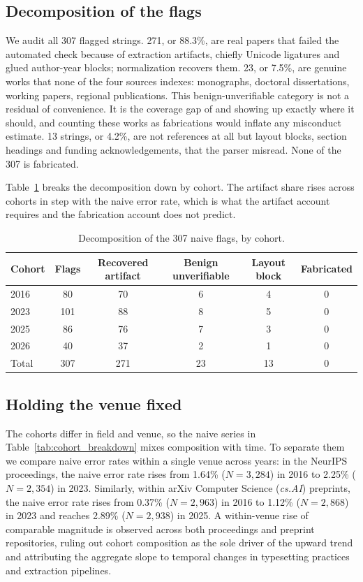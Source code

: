 \documentclass[11pt, a4paper]{article}
\begin{document}
\subsection{Decomposition of the flags}
We audit all 307 flagged strings. 271, or 88.3\%, are real papers that failed the automated check because of extraction artifacts, chiefly Unicode ligatures and glued author-year blocks; normalization recovers them. 23, or 7.5\%, are genuine works that none of the four sources indexes: monographs, doctoral dissertations, working papers, regional publications. This benign-unverifiable category is not a residual of convenience. It is the coverage gap of \citet{martinmartin2018} and \citet{visser2021} showing up exactly where it should, and counting these works as fabrications would inflate any misconduct estimate. 13 strings, or 4.2\%, are not references at all but layout blocks, section headings and funding acknowledgements, that the parser misread. None of the 307 is fabricated.

Table~\ref{tab:cohort_decomposition} breaks the decomposition down by cohort. The artifact share rises across cohorts in step with the naive error rate, which is what the artifact account requires and the fabrication account does not predict.

\begin{table}[htbp]
\centering
\caption{Decomposition of the 307 naive flags, by cohort.}
\label{tab:cohort_decomposition}
\begin{tabular}{lccccc}
\toprule
\textbf{Cohort} & \textbf{Flags} & \textbf{Recovered artifact} & \textbf{Benign unverifiable} & \textbf{Layout block} & \textbf{Fabricated} \\
\midrule
2016 & 80 & 70 & 6 & 4 & 0 \\
2023 & 101 & 88 & 8 & 5 & 0 \\
2025 & 86 & 76 & 7 & 3 & 0 \\
2026 & 40 & 37 & 2 & 1 & 0 \\
\midrule
Total & 307 & 271 & 23 & 13 & 0 \\
\bottomrule
\end{tabular}
\end{table}

\subsection{Holding the venue fixed}
The cohorts differ in field and venue, so the naive series in Table~\ref{tab:cohort_breakdown} mixes composition with time. To separate them we compare naive error rates within a single venue across years: in the NeurIPS proceedings, the naive error rate rises from 1.64\% ($N = 3{,}284$) in 2016 to 2.25\% ($N = 2{,}354$) in 2023. Similarly, within arXiv Computer Science (\textit{cs.AI}) preprints, the naive error rate rises from 0.37\% ($N = 2{,}963$) in 2016 to 1.12\% ($N = 2{,}868$) in 2023 and reaches 2.89\% ($N = 2{,}938$) in 2025. A within-venue rise of comparable magnitude is observed across both proceedings and preprint repositories, ruling out cohort composition as the sole driver of the upward trend and attributing the aggregate slope to temporal changes in typesetting practices and extraction pipelines.
\end{document}
